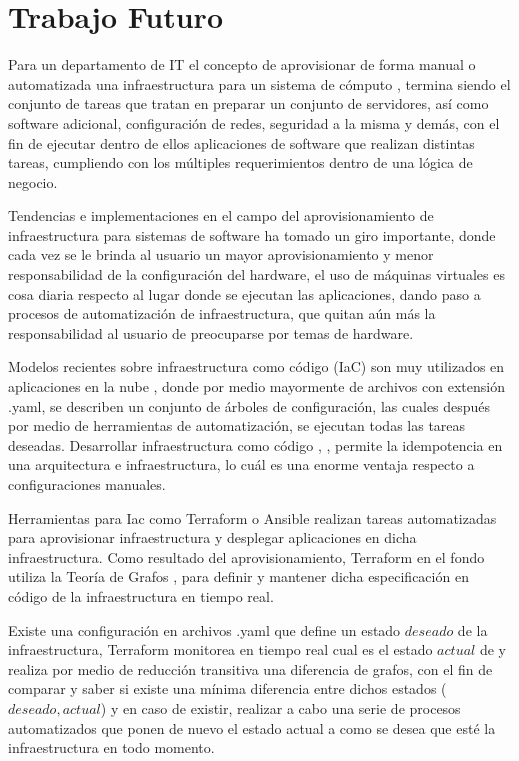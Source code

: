 \documentclass[journal]{IEEEtran}
\begin{document}
\section{Trabajo Futuro}

Para un departamento de IT el concepto de aprovisionar de forma manual o automatizada una infraestructura para un sistema de cómputo \cite{aut-cloud-prov}, termina siendo el conjunto de tareas que tratan en preparar un conjunto de servidores, así como software adicional, configuración de redes, seguridad a la misma y demás, con el fin de ejecutar dentro de ellos aplicaciones de software que realizan distintas tareas, cumpliendo con los múltiples requerimientos dentro de una lógica de negocio.

Tendencias e implementaciones en el campo del aprovisionamiento de infraestructura para sistemas de software ha tomado un giro importante, donde cada vez se le brinda al usuario un mayor aprovisionamiento y menor responsabilidad de la configuración del hardware, el uso de máquinas virtuales \cite{virt-machines} es cosa diaria respecto al lugar donde se ejecutan las aplicaciones, dando paso a procesos de automatización de infraestructura, que quitan aún más la responsabilidad al usuario de preocuparse por temas de hardware.

Modelos recientes sobre infraestructura como código (IaC) \cite{artac-iac} son muy utilizados en aplicaciones en la nube \cite{morris-iac}, donde por medio mayormente de archivos con extensión .yaml, se describen un conjunto de árboles de configuración, las cuales después por medio de herramientas de automatización, se ejecutan todas las tareas deseadas. Desarrollar infraestructura como código \cite{guerr-iac}, \cite{huttermann-iac}, permite la idempotencia en una arquitectura e infraestructura, lo cuál es una enorme ventaja respecto a configuraciones manuales.

Herramientas para Iac como Terraform o Ansible \cite{terraf-ansib} realizan tareas automatizadas para aprovisionar infraestructura y desplegar aplicaciones en dicha infraestructura. Como resultado del aprovisionamiento, Terraform en el fondo utiliza la Teoría de Grafos \cite{Aldous-graphs}, \cite{Kamada-graphs} para definir y mantener dicha especificación en código de la infraestructura en tiempo real. 

Existe una configuración en archivos .yaml que define un estado $deseado$ de la infraestructura, Terraform monitorea en tiempo real cual es el estado $actual$ de y realiza por medio de reducción transitiva una diferencia de grafos, con el fin de comparar y saber si existe una mínima diferencia entre dichos estados ($deseado, actual$) y en caso de existir, realizar a cabo una serie de procesos automatizados que ponen de nuevo el estado actual a como se desea que esté la infraestructura en todo momento.
\end{document}

